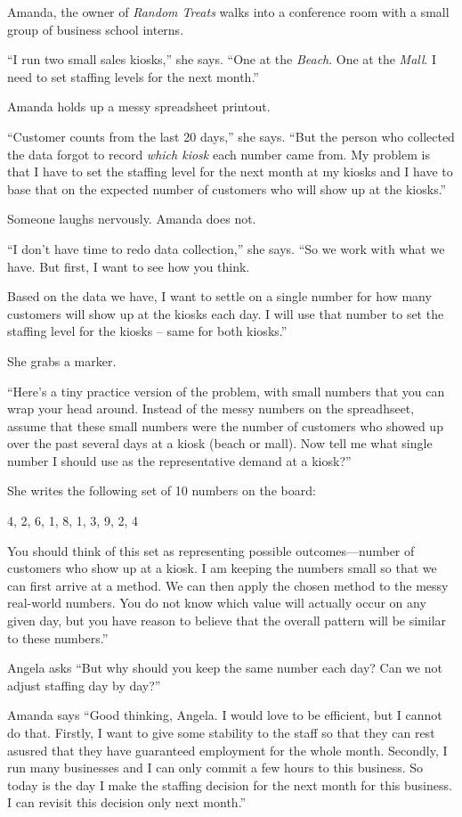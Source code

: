 \documentclass[
  12pt,
  letterpaper,
  DIV=11,
  numbers=noendperiod]{scrreprt}
\begin{document}
Amanda, the owner of \emph{Random Treats} walks into a conference room
with a small group of business school interns.

``I run two small sales kiosks,'' she says. ``One at the \emph{Beach}.
One at the \emph{Mall}. I need to set staffing levels for the next
month.''

Amanda holds up a messy spreadsheet printout.

``Customer counts from the last 20 days,'' she says. ``But the person
who collected the data forgot to record \emph{which kiosk} each number
came from. My problem is that I have to set the staffing level for the
next month at my kiosks and I have to base that on the expected number
of customers who will show up at the kiosks.''

Someone laughs nervously. Amanda does not.

``I don't have time to redo data collection,'' she says. ``So we work
with what we have. But first, I want to see how you think.

Based on the data we have, I want to settle on a single number for how
many customers will show up at the kiosks each day. I will use that
number to set the staffing level for the kiosks -- same for both
kiosks.''

She grabs a marker.

``Here's a tiny practice version of the problem, with small numbers that
you can wrap your head around. Instead of the messy numbers on the
spreadhseet, assume that these small numbers were the number of
customers who showed up over the past several days at a kiosk (beach or
mall). Now tell me what single number I should use as the representative
demand at a kiosk?''

She writes the following set of 10 numbers on the board:

4, 2, 6, 1, 8, 1, 3, 9, 2, 4

You should think of this set as representing possible outcomes---number
of customers who show up at a kiosk. I am keeping the numbers small so
that we can first arrive at a method. We can then apply the chosen
method to the messy real-world numbers. You do not know which value will
actually occur on any given day, but you have reason to believe that the
overall pattern will be similar to these numbers.''

Angela asks ``But why should you keep the same number each day? Can we
not adjust staffing day by day?''

Amanda says ``Good thinking, Angela. I would love to be efficient, but I
cannot do that. Firstly, I want to give some stability to the staff so
that they can rest asusred that they have guaranteed employment for the
whole month. Secondly, I run many businesses and I can only commit a few
hours to this business. So today is the day I make the staffing decision
for the next month for this business. I can revisit this decision only
next month.''
\end{document}
